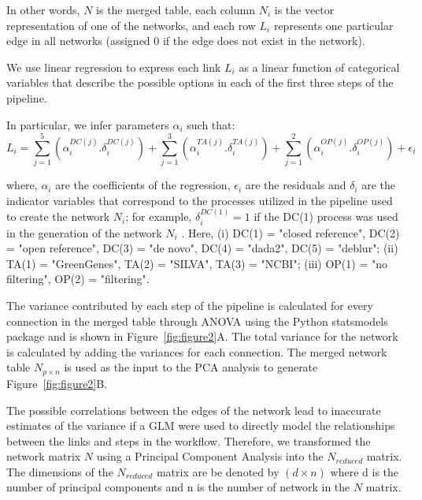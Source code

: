   In other words, $N$ is the merged table, each column $N_i$ is the vector representation of one of the networks, and each row $L_i$ represents one particular edge in all networks (assigned 0 if the edge does not exist in the network).

  We use linear regression to express each link $L_i$ as a linear function of categorical variables that describe the possible options in each of the first three steps of the pipeline.

  In particular, we infer parameters $\alpha_i$ such that:
   \begin{equation*}
       L_i = \sum_{j=1}^5 \left( \alpha^{DC(j)}_i.\delta^{DC(j)}_i \right) +
             \sum_{j=1}^3 \left( \alpha^{TA(j)}_i.\delta^{TA(j)}_i \right) +
             \sum_{j=1}^2 \left( \alpha^{OP(j)}_i.\delta^{OP(j)}_i \right) +
             \epsilon_i
   \end{equation*}

   where, $\alpha_i$ are the coefficients of the regression, $\epsilon_i$ are the residuals and $\delta_i$ are the indicator variables that correspond to the processes utilized in the pipeline used to create the network $N_i$; for example, $\delta^{DC(1)}_i = 1$ if the DC(1) process was used in the generation of the network $N_i$ .
   Here, (i) DC(1) = "closed reference", DC(2) = "open reference", DC(3) = "de novo", DC(4) = "dada2", DC(5) = "deblur"; (ii)  TA(1) = "GreenGenes", TA(2) = "SILVA", TA(3) = "NCBI"; (iii) OP(1) = "no filtering", OP(2) = "filtering".

  The variance contributed by each step of the pipeline is calculated for every connection in the merged table through ANOVA using the Python statsmodels package and is shown in Figure~\ref{fig:figure2}A.
  The total variance for the network is calculated by adding the variances for each connection.
  The merged network table $N_{p \times n}$ is used as the input to the PCA analysis to generate Figure~\ref{fig:figure2}B.
  
  The possible correlations between the edges of the network lead to inaccurate estimates of the variance if a GLM were used to directly model the relationships between the links and steps in the workflow. Therefore, we transformed the network matrix $N$ using a Principal Component Analysis into the $N_{reduced}$ matrix. The dimensions of the $N_{reduced}$ matrix are be denoted by $(d \times n)$ where d is the number of principal components and n is the number of network in the $N$ matrix.



